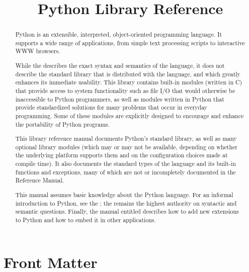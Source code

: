 \documentclass{manual}
\title{Python Library Reference}
\begin{document}
\maketitle

\ifhtml
\chapter*{Front Matter\label{front}}
\fi



\begin{abstract}

\noindent
Python is an extensible, interpreted, object-oriented programming
language.  It supports a wide range of applications, from simple text
processing scripts to interactive WWW browsers.

While the 
describes the exact syntax and semantics of the language, it does not
describe the standard library that is distributed with the language,
and which greatly enhances its immediate usability.  This library
contains built-in modules (written in C) that provide access to system
functionality such as file I/O that would otherwise be inaccessible to
Python programmers, as well as modules written in Python that provide
standardized solutions for many problems that occur in everyday
programming.  Some of these modules are explicitly designed to
encourage and enhance the portability of Python programs.

This library reference manual documents Python's standard library, as
well as many optional library modules (which may or may not be
available, depending on whether the underlying platform supports them
and on the configuration choices made at compile time).  It also
documents the standard types of the language and its built-in
functions and exceptions, many of which are not or incompletely
documented in the Reference Manual.

This manual assumes basic knowledge about the Python language.  For an
informal introduction to Python, see the
; the
 remains the
highest authority on syntactic and semantic questions.  Finally, the
manual entitled  describes how to add new extensions to Python
and how to embed it in other applications.

\end{abstract}
\end{document}
